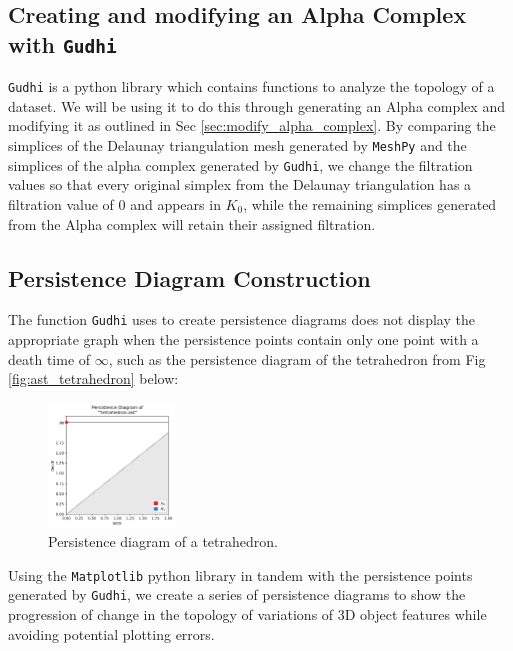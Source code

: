 \documentclass[ma]{uncgdissertationexp}
\theoremstyle{plain}
\theoremstyle{definition}
\theoremstyle{remark}
\begin{document}
\cprotect\subsection{Creating and modifying an Alpha Complex with \verb+Gudhi+}
\par \verb"Gudhi" is a python library which contains functions to analyze the topology of a dataset. We will be using it to do this through generating an Alpha complex and modifying it as outlined in Sec \ref{sec:modify_alpha_complex}. By comparing the simplices of the Delaunay triangulation mesh generated by \verb"MeshPy" and the simplices of the alpha complex generated by \verb"Gudhi", we change the filtration values so that every original simplex from the Delaunay triangulation has a filtration value of 0 and appears in $K_{0}$, while the remaining simplices generated from the Alpha complex will retain their assigned filtration.

\subsection{Persistence Diagram Construction}
\par The function \verb"Gudhi" uses to create persistence diagrams does not display the appropriate graph when the persistence points contain only one point with a death time of $\infty$, such as the persistence diagram of the tetrahedron from Fig \ref{fig:ast_tetrahedron} below:
\begin{figure}[H]
    \begin{center}
	    \includegraphics[width=0.3\textwidth]{tetrahedron persdia.png}
    	\caption{Persistence diagram of a tetrahedron.}
    \end{center}
\end{figure}
\par Using the \verb"Matplotlib" python library in tandem with the persistence points generated by \verb"Gudhi", we create a series of persistence diagrams to show the progression of change in the topology of variations of 3D object features while avoiding potential plotting errors.
\end{document}
